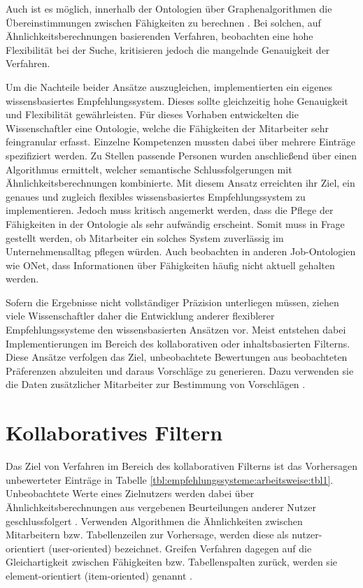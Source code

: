 Auch ist es möglich, innerhalb der Ontologien über Graphenalgorithmen die Übereinstimmungen zwischen Fähigkeiten zu berechnen \cite[S. 1f.]{balachander:2018}. Bei solchen, auf Ähnlichkeitsberechnungen basierenden Verfahren, beobachten \textcite[S. 4]{bianchini:2008} eine hohe Flexibilität bei der Suche, kritisieren jedoch die mangelnde Genauigkeit der Verfahren.

Um die Nachteile beider Ansätze auszugleichen, implementierten \textcite[S. 4ff.]{semanticMatchmaking:2009} ein eigenes wissensbasiertes Empfehlungssystem. Dieses sollte gleichzeitig hohe Genauigkeit und Flexibilität gewährleisten. Für dieses Vorhaben entwickelten die Wissenschaftler eine Ontologie, welche die Fähigkeiten der Mitarbeiter sehr feingranular erfasst. Einzelne Kompetenzen mussten dabei über mehrere Einträge spezifiziert werden. Zu Stellen passende Personen wurden anschließend über einen Algorithmus ermittelt, welcher semantische Schlussfolgerungen mit Ähnlichkeitsberechnungen kombinierte. Mit diesem Ansatz erreichten \textcite[S. 11f.]{semanticMatchmaking:2009} ihr Ziel, ein genaues und zugleich flexibles wissensbasiertes Empfehlungssystem zu implementieren. Jedoch muss kritisch angemerkt werden, dass die Pflege der Fähigkeiten in der Ontologie als sehr aufwändig erscheint. Somit muss in Frage gestellt werden, ob Mitarbeiter ein solches System zuverlässig im Unternehmensalltag pflegen würden. Auch \textcite[S. 2]{aCombinedRepresentation:2018} beobachten in anderen Job-Ontologien wie \acs{ONet}, dass Informationen über Fähigkeiten häufig nicht aktuell gehalten werden.

Sofern die Ergebnisse nicht vollständiger Präzision unterliegen müssen, ziehen viele Wissenschaftler daher die Entwicklung anderer flexiblerer Empfehlungssysteme den wissensbasierten Ansätzen vor. Meist entstehen dabei Implementierungen im Bereich des kollaborativen oder inhaltsbasierten Filterns. Diese Ansätze verfolgen das Ziel, unbeobachtete Bewertungen aus beobachteten Präferenzen abzuleiten und daraus Vorschläge zu generieren. Dazu verwenden sie die Daten zusätzlicher Mitarbeiter zur Bestimmung von Vorschlägen \cite[S. 3ff.]{recommenderSystems:2016}.

\section{Kollaboratives Filtern}
\label{ch:empfehlungssysteme:cf}
Das Ziel von Verfahren im Bereich des kollaborativen Filterns ist das Vorhersagen unbewerteter Einträge in Tabelle \ref{tbl:empfehlungssysteme:arbeitsweise:tbl1}. Unbeobachtete Werte eines Zielnutzers werden dabei über Ähnlichkeitsberechnungen aus vergebenen Beurteilungen anderer Nutzer geschlussfolgert \cite[S. 1]{su:2009}. Verwenden Algorithmen die Ähnlichkeiten zwischen Mitarbeitern bzw. Tabellenzeilen zur Vorhersage, werden diese als nutzer-orientiert (user-oriented) bezeichnet. Greifen Verfahren dagegen auf die Gleichartigkeit zwischen Fähigkeiten bzw. Tabellenspalten zurück, werden sie element-orientiert (item-oriented) genannt \cite[S. 1f.]{duong:2018}.

